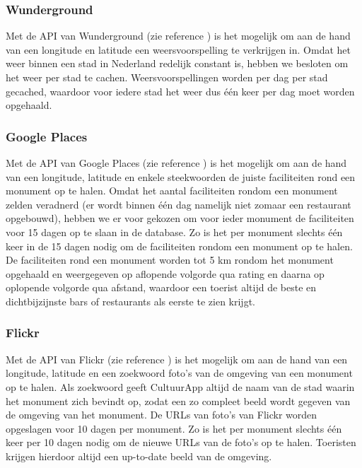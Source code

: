 \documentclass[a4paper,10pt]{article}
\begin{document}
		\subsubsection{Wunderground}
		Met de API van Wunderground (zie reference \cite{2}) is het mogelijk om aan de hand van een longitude en latitude een weersvoorspelling te verkrijgen in. Omdat het weer binnen een stad in Nederland redelijk constant is, hebben we besloten om het weer per stad te cachen. Weersvoorspellingen worden per dag per stad gecached, waardoor voor iedere stad het weer dus \'e\'en keer per dag moet worden opgehaald.
	
		\subsubsection{Google Places}
		Met de API van Google Places (zie reference \cite{3}) is het mogelijk om aan de hand van een longitude, latitude en enkele steekwoorden de juiste faciliteiten rond een monument op te halen. Omdat het aantal faciliteiten rondom een monument zelden veradnerd (er wordt binnen \'e\'en dag namelijk niet zomaar een restaurant opgebouwd), hebben we er voor gekozen om voor ieder monument de faciliteiten voor 15 dagen op te slaan in de database. Zo is het per monument slechts \'e\'en keer in de 15 dagen nodig om de faciliteiten rondom een monument op te halen. De faciliteiten rond een monument worden tot 5 km rondom het monument opgehaald en weergegeven op aflopende volgorde qua rating en daarna op oplopende volgorde qua afstand, waardoor een toerist altijd de beste en dichtbijzijnste bars of restaurants als eerste te zien krijgt.
	
		\subsubsection{Flickr}
		Met de API van Flickr (zie reference \cite{4}) is het mogelijk om aan de hand van een longitude, latitude en een zoekwoord foto's van de omgeving van een monument op te halen. Als zoekwoord geeft CultuurApp altijd de naam van de stad waarin het monument zich bevindt op, zodat een zo compleet beeld wordt gegeven van de omgeving van het monument. De URLs van foto's van Flickr worden opgeslagen voor 10 dagen per monument. Zo is het per monument slechts \'e\'en keer per 10 dagen nodig om de nieuwe URLs van de foto's op te halen. Toeristen krijgen hierdoor altijd een up-to-date beeld van de omgeving.
		
\end{document}
